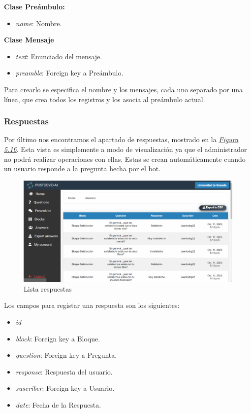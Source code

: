 \textbf{Clase Preámbulo:}

\begin{itemize}
    \item \textit{name}: Nombre.
\end{itemize}

\textbf{Clase Mensaje}

\begin{itemize}
    \item \textit{text}: Enunciado del mensaje.
    \item \textit{preamble}: Foreign key a Preámbulo.
\end{itemize}


Para crearlo se especifica el nombre y los mensajes, cada uno separado por una línea, que crea todos los registros y los asocia al preámbulo actual.\vspace{0.5cm}

\subsubsection{Respuestas}

Por último nos encontramos el apartado de respuestas, mostrado en la \textit{\hyperref[fig:list-answers]{Figura 5.16}}. Esta vista es simplemente a modo de visualización ya que el administrador no podrá realizar operaciones con ellas. Estas se crean automáticamente cuando un usuario responde a la pregunta hecha por el bot. 

\begin{figure}[!ht]
    \centering
    \includegraphics[width=1\textwidth]{imagenes/list_answers.png}
    \caption{Lista respuestas}
    \label{fig:list-answers}
\end{figure}


Los campos para registar una respuesta son los siguientes:

\begin{itemize}
    \item \textit{id}
    \item \textit{block}: Foreign key a Bloque.
    \item \textit{question}: Foreign key a Pregunta.
    \item \textit{response}: Respuesta del usuario.
    \item \textit{suscriber}: Foreign key a Usuario.
    \item \textit{date}: Fecha de la Respuesta.
\end{itemize}


